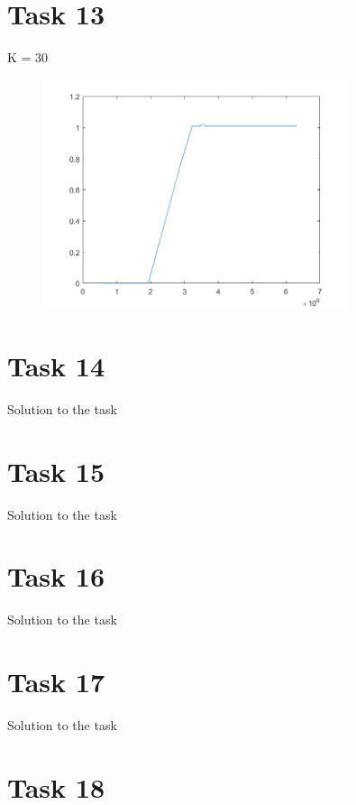 \documentclass[a4paper,12pt,oneside,onecolumn]{article} %
\begin{document}
\section*{Task 13}
K = 30
\begin{figure}[H]
\begin{center}	
  \includegraphics[width = 0.8\textwidth]{task13.png}
 \end{center}
\end{figure}

\section*{Task 14}

Solution to the task

\section*{Task 15}

Solution to the task

\section*{Task 16}

Solution to the task

\section*{Task 17}

Solution to the task

\section*{Task 18}
\end{document}
